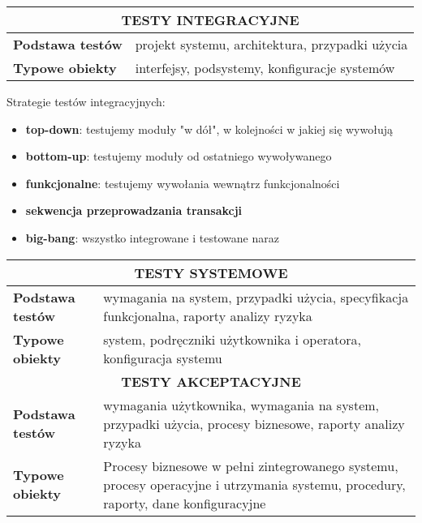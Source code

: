 \documentclass[../main.tex]{subfiles}
\begin{document}
    \begin{table}[H]
        \begin{center}
            \begin{tabular}{| p{8cm}| p{8cm}|}
                \hline
                \multicolumn{2}{|c|}{ \textbf{TESTY INTEGRACYJNE}}\\
                \hline
                \textbf{Podstawa testów} & projekt systemu, architektura, przypadki użycia\\
                \hline
                \textbf{Typowe obiekty} & interfejsy, podsystemy, konfiguracje systemów\\
                \hline
            \end{tabular}
        \end{center}
    \end{table}
    Strategie testów integracyjnych:
    \begin{itemize}
        \item \textbf{top-down}: testujemy moduły "w dół", w kolejności w jakiej się
        wywołują
        \item \textbf{bottom-up}: testujemy moduły od ostatniego wywoływanego
        \item \textbf{funkcjonalne}: testujemy wywołania wewnątrz funkcjonalności
        \item \textbf{sekwencja przeprowadzania transakcji}
        \item \textbf{big-bang}: wszystko integrowane i testowane naraz
    \end{itemize}
    \begin{table}[H]
        \begin{center}
            \begin{tabular}{| p{8cm}| p{8cm}|}
                \hline
                \multicolumn{2}{|c|}{ \textbf{TESTY SYSTEMOWE}}\\
                \hline
                \textbf{Podstawa testów} & wymagania na system, przypadki użycia,
                specyfikacja funkcjonalna, raporty analizy ryzyka\\
                \hline
                \textbf{Typowe obiekty} & system, podręczniki użytkownika i operatora,
                konfiguracja systemu\\
                \hline
                \hline
                \multicolumn{2}{|c|}{ \textbf{TESTY AKCEPTACYJNE}}\\
                \hline
                \textbf{Podstawa testów} & wymagania użytkownika, wymagania na system,
                przypadki użycia, procesy biznesowe, raporty
                analizy ryzyka\\
                \hline
                \textbf{Typowe obiekty} & Procesy biznesowe w pełni zintegrowanego
                systemu, procesy operacyjne i utrzymania systemu,
                procedury, raporty, dane konfiguracyjne\\
                \hline
            \end{tabular}
        \end{center}
    \end{table}
\end{document}
